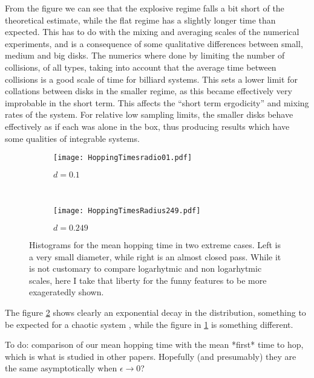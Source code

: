 \documentclass[letterpaper,10pt]{article}
\begin{document}
From the figure we can see that the explosive regime falls a bit short of
the theoretical estimate, while  the flat regime has a slightly longer
time than expected. This has to do with the mixing and averaging scales
of the numerical experiments, and is a consequence of some
qualitative differences between small, medium and big disks. The numerics where done
by limiting the number of collisions, of all types, taking into account
that the average time between collisions is a good scale of time
for billiard systems. This sets a lower limit for collations between
disks in the smaller regime, as this became effectively very
improbable in the short term. This affects the ``short term ergodicity'' and
mixing rates of the system. For relative low sampling limits, the
smaller disks behave effectively as if each was alone in the box, thus
producing results which have some qualities of integrable systems. 

\begin{figure}[h]
        \centering
        \begin{subfigure}[b]{0.45\textwidth}
                \centering
                \texttt{[image: HoppingTimesradio01.pdf]}
                \caption{$d=0.1$}
                \label{smallradious}
        \end{subfigure}%
        ~ %
        \begin{subfigure}[b]{0.45\textwidth}
                \centering
                \texttt{[image: HoppingTimesRadius249.pdf]}
                \caption{$d=0.249$}
                \label{bigradious}
        \end{subfigure}       
        \caption{Histograms for the mean hopping time
in two extreme cases. Left is a very small diameter, while right is an almost
closed pass. While it is not customary to compare logarhytmic and non
logarhytmic scales, here I take that liberty for the funny features to be
more exageratedly shown.}\label{histohopps}
\end{figure}

The figure \ref{bigradious} shows clearly an exponential decay in the
distribution, something to be expected for a chaotic system \cite{OttLibro} , while the
figure in \ref{smallradious} is something different. 

To do: comparison of our mean hopping time with the mean *first* time to hop, which is what is studied in other papers.
Hopefully (and presumably) they are the same asymptotically when $\epsilon \to 0$?
\end{document}
